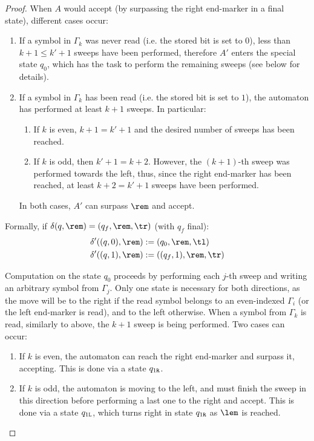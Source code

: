 \begin{proof}
	When $A$ would accept (by surpassing the right end-marker in a final state), different cases occur:
	\begin{enumerate}
		\item If a symbol in $\Gamma_k$ was never read (i.e. the stored bit is set to $0$), less than $k+1\le k'+1$ sweeps have been performed, therefore $A'$ enters the special state $q_0$, which has the task to perform the remaining sweeps (see below for details).
		\item If a symbol in $\Gamma_k$ has been read (i.e. the stored bit is set to $1$), the automaton has performed at least $k+1$ sweeps. In particular:
		      \begin{enumerate}
			      \item If $k$ is even, $k+1=k'+1$ and the desired number of sweeps has been reached.
			      \item If $k$ is odd, then $k'+1=k+2$. However, the $(k+1)$-th sweep was performed towards the left, thus, since the right end-marker has been reached, at least $k+2=k'+1$ sweeps have been performed.
		      \end{enumerate}
		      In both cases, $A'$ can surpass $\rem$ and accept.
	\end{enumerate}

	Formally, if $\delta(q,\rem)=(q_f,\rem,\tr)$ (with $q_f$ final):
	\begin{align*}
		\delta'((q,0),\rem) & := (q_0,\rem,\tl)     \\
		\delta'((q,1),\rem) & := ((q_f,1),\rem,\tr)
	\end{align*}

	Computation on the state $q_0$ proceeds by performing each $j$-th sweep and writing an arbitrary symbol from $\Gamma_j$.
	Only one state is necessary for both directions, as the move will be to the right if the read symbol belongs to an even-indexed $\Gamma_i$ (or the left end-marker is read), and to the left otherwise.
	When a symbol from $\Gamma_k$ is read, similarly to above, the $k+1$ sweep is being performed. Two cases can occur:
	\begin{enumerate}
		\item If $k$ is even, the automaton can reach the right end-marker and surpass it, accepting. This is done via a state $q_{1\mathtt{R}}$.
		\item If $k$ is odd, the automaton is moving to the left, and must finish the sweep in this direction before performing a last one to the right and accept. This is done via a state $q_{1\mathtt{L}}$, which turns right in state $q_{1\mathtt{R}}$ as $\lem$ is reached.
	\end{enumerate}


\end{proof}
